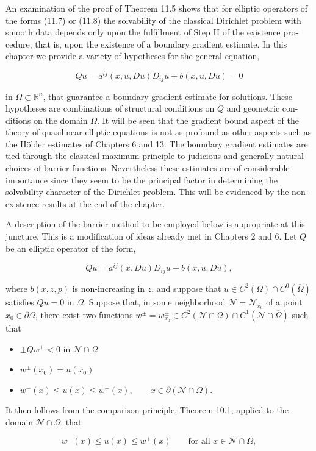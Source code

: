 An examination of the proof of Theorem 11.5 shows that for elliptic operators of
the forms (11.7) or (11.8) the solvability of the classical Dirichlet problem with
smooth data depends only upon the fulfillment of Step II of the existence pro-
cedure, that is, upon the existence of a boundary gradient estimate. In this chapter
we provide a variety of hypotheses for the general equation,

\begin{equation}
Qu=a^{ij}(x, u, Du)D_{ij}u+b(x, u, Du)=0
\tag{14.1}
\end{equation}

in $\Omega\subset\mathbb{R}^n$, that guarantee a boundary gradient estimate for solutions. These
hypotheses are combinations of structural conditions on $Q$ and geometric con-
ditions on the domain $\Omega$. It will be seen that the gradient bound aspect of the theory
of quasilinear elliptic equations is not as profound as other aspects such as the
Hölder estimates of Chapters 6 and 13. The boundary gradient estimates are tied
through the classical maximum principle to judicious and generally natural choices
of barrier functions. Nevertheless these estimates are of considerable importance
since they seem to be the principal factor in determining the solvability character
of the Dirichlet problem. This will be evidenced by the non-existence results at the
end of the chapter.

\medskip

    A description of the barrier method to be employed below is appropriate at this
juncture. This is a modification of ideas already met in Chapters 2 and 6. Let $Q$
be an elliptic operator of the form,

\begin{equation}
Qu=a^{ij}(x, Du)D_{ij}u+b(x, u, Du),
\tag{14.2}
\end{equation}

where $b(x, z, p)$ is non-increasing in $z$, and suppose that $u\in C^2(\Omega)\cap C^0(\overline{\Omega})$
satisfies $Qu=0$ in $\Omega$. Suppose that, in some neighborhood $\mathcal{N}=\mathcal{N}_{x_0}$ of a point
$x_0\in\partial\Omega$, there exist two functions $w^\pm=w^\pm_{x_0}\in C^2(\mathcal{N}\cap\Omega)\cap C^1(\mathcal{N}\cap\overline{\Omega})$ such that

\begin{itemize}
\item[(i)] $\pm Qw^\pm<0$ in $\mathcal{N}\cap\Omega$
\item[(ii)] $w^\pm(x_0)=u(x_0)$
\item[(iii)] $w^-(x)\leq u(x)\leq w^+(x), \qquad x\in\partial(\mathcal{N}\cap\Omega)$.
\end{itemize}

It then follows from the comparison principle, Theorem 10.1, applied to the domain
$\mathcal{N}\cap\Omega$, that

\[
w^-(x)\leq u(x)\leq w^+(x)\qquad\text{for all }x\in\mathcal{N}\cap\Omega,
\]
